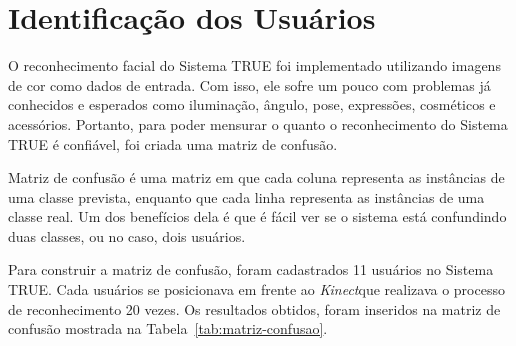 \section{Identificação dos Usuários}
	 
	O reconhecimento facial do Sistema TRUE foi implementado utilizando imagens de cor como dados de entrada. Com isso, ele sofre um pouco com problemas já conhecidos e esperados como iluminação, ângulo, pose, expressões, cosméticos e acessórios. Portanto, para poder mensurar o quanto o reconhecimento do Sistema TRUE é confiável, foi criada uma matriz de confusão.

	Matriz de confusão é uma matriz em que cada coluna representa as instâncias de uma classe prevista, enquanto que cada linha representa as instâncias de uma classe real. Um dos benefícios dela é que é fácil ver se o sistema está confundindo duas classes, ou no caso, dois usuários.

	Para construir a matriz de confusão, foram cadastrados 11 usuários no Sistema TRUE. Cada usuários se posicionava em frente ao \textit{Kinect}que realizava o processo de reconhecimento 20 vezes. Os resultados obtidos, foram inseridos na matriz de confusão mostrada na Tabela~\ref{tab:matriz-confusao}.
	
